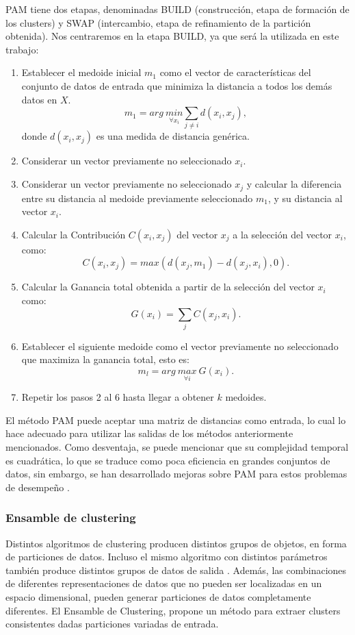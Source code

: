 \bigskip PAM tiene dos etapas, denominadas BUILD (construcción, etapa de formación de los clusters) y SWAP (intercambio, etapa de refinamiento de la partición obtenida). Nos centraremos en la etapa BUILD, ya que será la utilizada en este trabajo:
\begin{enumerate}
	\item Establecer el medoide inicial \(m_1\) como el vector de características del conjunto de datos de entrada que minimiza la distancia a todos los demás datos en \(X\).
\[m_1 = arg \> \underset{\forall x_i}{min} \sum_{j \neq i}d(x_i,x_j),\]
donde \(d(x_i,x_j)\) es una medida de distancia genérica.
	\item Considerar un vector previamente no seleccionado \(x_i\).
	\item Considerar un vector previamente no seleccionado \(x_j\) y calcular la diferencia entre su distancia al medoide previamente seleccionado \(m_1\), y su distancia al vector \(x_i\).
	\item Calcular la Contribución \(C(x_i,x_j)\) del vector \(x_j\) a la selección del vector \(x_i\), como:
\[C(x_i, x_j) = max(d(x_j, m_1) - d(x_j, x_i), 0).\]
	\item Calcular la Ganancia total obtenida a partir de la selección del vector \(x_i\) como:
\[G(x_i) = \sum_{j} C(x_j, x_i).\]
	\item Establecer el siguiente medoide como el vector previamente no seleccionado que maximiza la ganancia total, esto es:
\[m_l = arg \> \underset{\forall i}{max} \> G(x_i).\]
	\item Repetir los pasos 2 al 6 hasta llegar a obtener \(k\) medoides.
\end{enumerate}

\bigskip El método PAM puede aceptar una matriz de distancias como entrada, lo cual lo hace adecuado para utilizar las salidas de los métodos anteriormente mencionados. Como desventaja, se puede mencionar que su complejidad temporal es cuadrática, lo que se traduce como poca eficiencia en grandes conjuntos de datos, sin embargo, se han desarrollado mejoras sobre PAM para estos problemas de desempeño \citep{kaufman2009finding}.

\subsubsection{Ensamble de clustering}
Distintos algoritmos de clustering producen distintos grupos de objetos, en forma de particiones de datos. Incluso el mismo algoritmo con distintos parámetros también produce distintos grupos de datos de salida \citep{xu2008clustering}. Además, las combinaciones de diferentes representaciones de datos que no pueden ser localizadas en un espacio dimensional, pueden generar particiones de datos completamente diferentes. El Ensamble de Clustering, propone un método para extraer clusters consistentes dadas particiones variadas de entrada.

